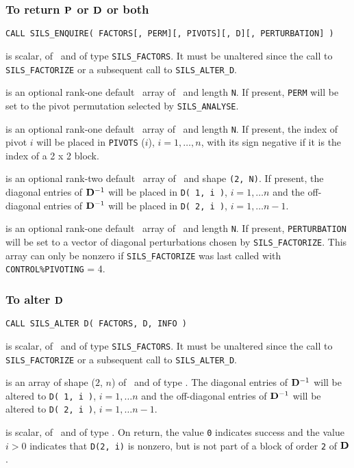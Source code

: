 \documentclass{galahad}
\newcommand{\packagename}{SILS}
\begin{document}
\subsubsection{To return ${\mathbf{P}}$ or ${\mathbf{D}}$ or both}

\hskip0.5in
{\tt CALL \packagename\_ENQUIRE( FACTORS[, PERM][, PIVOTS][, D][, PERTURBATION] )}

\begin{description}
 is scalar, of \intentin\ and of type {\tt \packagename\_FACTORS}.
It must be unaltered since the call to {\tt \packagename\_FACTORIZE}
or a subsequent call to {\tt \packagename\_ALTER\_D}.

 is an optional rank-one default \integer\ array of \intentout\
 and length {\tt N}.
If present, {\tt PERM} will be set to the pivot permutation
selected by {\tt \packagename\_ANALYSE}.

 is an optional rank-one default \integer\ array of \intentout\
 and length {\tt N}.
If present, the index of pivot $i$ will be placed in
{\tt PIVOTS} ($i$), $i = 1, \ldots, n$, with its sign negative if it is
the index of a 2 x 2 block.

 is an optional rank-two default \realdp\ array
of \intentout\, and shape {\tt (2, N)}.
If present, the diagonal entries of ${\mathbf{D}}^{-1} $ will
be placed in {\tt D( 1, i )}, $i = 1, \ldots n$ and the off-diagonal
entries of ${\mathbf{D}}^{-1} $ will be placed in {\tt D( 2, i )},
$i = 1, \ldots n-1$.

 is an optional rank-one default \realdp\ array of
\intentout\ and length {\tt N}.
If present, {\tt PERTURBATION} will be set to a vector of diagonal perturbations
chosen by {\tt \packagename\_FACTORIZE}. This array can only be nonzero if
{\tt \packagename\_FACTORIZE} was last called with {\tt CONTROL\%PIVOTING} = 4.

\end{description}

\subsubsection{To alter ${\mathbf{D}}$}

\hskip0.5in
{\tt CALL \packagename\_ALTER D( FACTORS, D, INFO )}

\begin{description}
 is scalar, of \intentinout\ and of type
{\tt \packagename\_FACTORS}. It
must be unaltered since the call to {\tt \packagename\_FACTOR\-IZE}
or a subsequent call to {\tt \packagename\_ALTER\_D}.

 is an array of shape ($2$, $n$) of \intentinout\, and of
type \realdp. The diagonal entries of ${\mathbf{D}}^{-1} $ will
be altered to {\tt D( 1, i )}, $i = 1, \ldots n$ and the off-diagonal
entries of ${\mathbf{D}}^{-1} $ will be altered to {\tt D( 2, i )},
$i = 1, \ldots n-1$.

 is scalar, of \intentout\, and of type \integer.  On return,
the value {\tt 0} indicates success and the value $i > 0$ indicates that
{\tt D(2, i)} is nonzero, but is not part of a block of order
{\tt 2} of ${\mathbf{D}}$.

\end{description}
\end{document}
